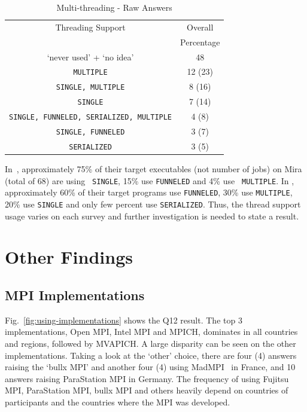 \documentclass[conference,10pt,letterpaper]{IEEEtran}
\def\myquote#1{`#1'}
\begin{document}
\begin{table}[htb]%
  \begin{center}%
    \caption{Multi-threading - Raw Answers}\label{tab:multi-thread-raw}%
    \begin{tabular}{c|c}%
      \hline%
      Threading Support & Overall \\
       & Percentage \\
      \hline%
      \myquote{never used} + \myquote{no idea} & 48 \\
      {\tt MULTIPLE} & 12 (23) \\
      {\tt SINGLE, MULTIPLE} & 8 (16) \\
      {\tt SINGLE} & 7 (14) \\
      {\tt SINGLE, FUNNELED, SERIALIZED, MULTIPLE} & 4 (8) \\
      {\tt SINGLE, FUNNELED} & 3 (7) \\
      {\tt SERIALIZED} & 3 (5) \\
      \hline%
    \end{tabular}%
  \end{center}%
\end{table}%

In~\cite{10.1109/SC.2018.00033}, approximately 75\% of their target
executables (not number of jobs) on Mira (total of 68) are using {\tt
  SINGLE}, 15\% use {\tt FUNNELED} and 4\% use {\tt
  MULTIPLE}. In \cite{10.1145/3295500.3356176},  approximately 60\% of
their target programs use {\tt FUNNELED}, 30\% use {\tt MULTIPLE}, 20\%
use {\tt SINGLE} and only few percent use {\tt SERIALIZED}. Thus, the
thread support usage varies on each survey and further investigation
is needed to state a result.

\section{Other Findings}

\subsection{MPI Implementations}

Fig.~\ref{fig:using-implementations} shows the Q12 result. The top 3
implementations, Open MPI, Intel MPI and MPICH, dominates in all
countries and regions, followed by MVAPICH. A large disparity can be
seen on the other implementations. Taking a
look at the \myquote{other} choice, there are four (4) answers raising the
\myquote{bullx MPI} and another four (4) using MadMPI~\cite{madmpi} in
France, and 10 
answers raising ParaStation MPI in Germany. The frequency of using
Fujitsu MPI, ParaStation MPI, bullx MPI and others heavily depend on
countries of participants and the countries where the MPI was
developed. 
\end{document}
